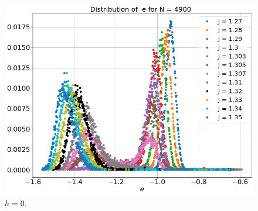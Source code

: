 \begin{figure}[H]
 	\includegraphics[scale=0.25]{Images/distr_energy_4900.png}
 	\caption{$h=0$.  }
 	\label{fig:distributions}
 \end{figure}